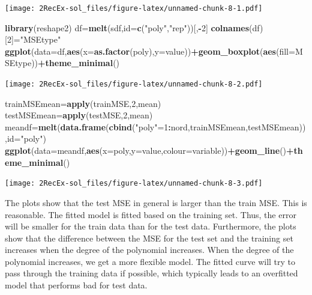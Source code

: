 \documentclass[]{article}
\newenvironment{Shaded}{\begin{snugshade}}{\end{snugshade}}
\newcommand{\KeywordTok}[1]{\textcolor[rgb]{0.13,0.29,0.53}{\textbf{#1}}}
\newcommand{\DataTypeTok}[1]{\textcolor[rgb]{0.13,0.29,0.53}{#1}}
\newcommand{\DecValTok}[1]{\textcolor[rgb]{0.00,0.00,0.81}{#1}}
\newcommand{\StringTok}[1]{\textcolor[rgb]{0.31,0.60,0.02}{#1}}
\newcommand{\OperatorTok}[1]{\textcolor[rgb]{0.81,0.36,0.00}{\textbf{#1}}}
\newcommand{\NormalTok}[1]{#1}
\begin{document}
\texttt{[image: 2RecEx-sol\_files/figure-latex/unnamed-chunk-8-1.pdf]}

\begin{Shaded}
\begin{Highlighting}[]
\KeywordTok{library}\NormalTok{(reshape2)}
\NormalTok{df=}\KeywordTok{melt}\NormalTok{(sdf,}\DataTypeTok{id=}\KeywordTok{c}\NormalTok{(}\StringTok{"poly"}\NormalTok{,}\StringTok{"rep"}\NormalTok{))[,}\OperatorTok{-}\DecValTok{2}\NormalTok{]}
\KeywordTok{colnames}\NormalTok{(df)[}\DecValTok{2}\NormalTok{]=}\StringTok{"MSEtype"}
\KeywordTok{ggplot}\NormalTok{(}\DataTypeTok{data=}\NormalTok{df,}\KeywordTok{aes}\NormalTok{(}\DataTypeTok{x=}\KeywordTok{as.factor}\NormalTok{(poly),}\DataTypeTok{y=}\NormalTok{value))}\OperatorTok{+}\KeywordTok{geom_boxplot}\NormalTok{(}\KeywordTok{aes}\NormalTok{(}\DataTypeTok{fill=}\NormalTok{MSEtype))}\OperatorTok{+}\KeywordTok{theme_minimal}\NormalTok{()}
\end{Highlighting}
\end{Shaded}

\texttt{[image: 2RecEx-sol\_files/figure-latex/unnamed-chunk-8-2.pdf]}

\begin{Shaded}
\begin{Highlighting}[]
\NormalTok{trainMSEmean=}\KeywordTok{apply}\NormalTok{(trainMSE,}\DecValTok{2}\NormalTok{,mean)}
\NormalTok{testMSEmean=}\KeywordTok{apply}\NormalTok{(testMSE,}\DecValTok{2}\NormalTok{,mean)}
\NormalTok{meandf=}\KeywordTok{melt}\NormalTok{(}\KeywordTok{data.frame}\NormalTok{(}\KeywordTok{cbind}\NormalTok{(}\StringTok{"poly"}\NormalTok{=}\DecValTok{1}\OperatorTok{:}\NormalTok{nord,trainMSEmean,testMSEmean)),}\DataTypeTok{id=}\StringTok{"poly"}\NormalTok{)}
\KeywordTok{ggplot}\NormalTok{(}\DataTypeTok{data=}\NormalTok{meandf,}\KeywordTok{aes}\NormalTok{(}\DataTypeTok{x=}\NormalTok{poly,}\DataTypeTok{y=}\NormalTok{value,}\DataTypeTok{colour=}\NormalTok{variable))}\OperatorTok{+}\KeywordTok{geom_line}\NormalTok{()}\OperatorTok{+}\KeywordTok{theme_minimal}\NormalTok{()}
\end{Highlighting}
\end{Shaded}

\texttt{[image: 2RecEx-sol\_files/figure-latex/unnamed-chunk-8-3.pdf]}

The plots show that the test MSE in general is larger than the train
MSE. This is reasonable. The fitted model is fitted based on the
training set. Thus, the error will be smaller for the train data than
for the test data. Furthermore, the plots show that the difference
between the MSE for the test set and the training set increases when the
degree of the polynomial increases. When the degree of the polynomial
increases, we get a more flexible model. The fitted curve will try to
pass through the training data if possible, which typically leads to an
overfitted model that performs bad for test data.
\end{document}

